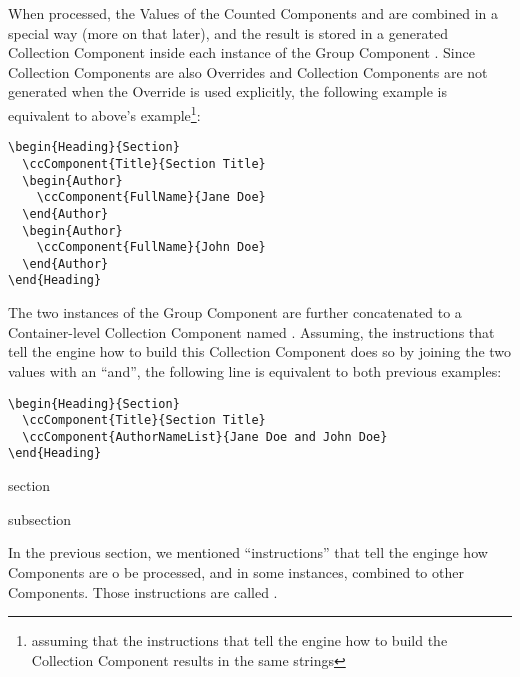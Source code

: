 When processed, the Values of the Counted Components
 and  are
combined in a special way (more on that later), and the result is
stored in a generated Collection Component 
inside each instance of the Group Component
. Since Collection Components are also
Overrides and Collection Components are not generated when the
Override is used explicitly, the following example is equivalent to
above's example\footnote{assuming that the instructions that tell the engine
how to build the Collection Component 
results in the same strings}:
\begin{lstlisting}[style=tex]
\begin{Heading}{Section}
  \ccComponent{Title}{Section Title}
  \begin{Author}
    \ccComponent{FullName}{Jane Doe}
  \end{Author}
  \begin{Author}
    \ccComponent{FullName}{John Doe}
  \end{Author}
\end{Heading}
\end{lstlisting}
The two instances of the Group Component  are
further concatenated to a Container-level Collection Component named
. Assuming, the instructions that tell
the engine how to build this Collection Component does so by joining
the two  values with an “and”, the following
line is equivalent to both previous examples:
\begin{lstlisting}[style=tex]
\begin{Heading}{Section}
  \ccComponent{Title}{Section Title}
  \ccComponent{AuthorNameList}{Jane Doe and John Doe}
\end{Heading}
\end{lstlisting}


\begin{Heading}{section}
\end{Heading}

\begin{Heading}{subsection}
\end{Heading}

In the previous section, we mentioned ``instructions'' that tell the
enginge how Components are o be processed, and in some instances,
combined to other Components. Those instructions are called
.

